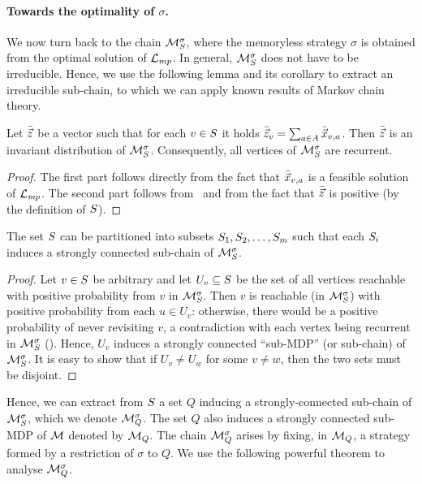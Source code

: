 \noindent
\paragraph{Towards the optimality of $ \sigma $.} We now turn back to the chain $\mathcal{M}_{S}^{\sigma}$, where the memoryless strategy $ \sigma $ is obtained from the optimal solution of $ \mathcal{L}_{\mathit{mp}} $. In general, $ \mathcal{M}_{S}^{\sigma} $ does not have to be irreducible. Hence, we use the following lemma and its corollary to extract an irreducible sub-chain, to which we can apply known results of Markov chain theory.

\begin{lemma}
\label{5-lem:mc-rec}
Let $\bar{\vec{z}}$ be a vector such that for each $v\in S$ it holds $\bar{\vec{z}}_v=\sum_{a\in A} \bar{\vec{x}}_{v,a}$. Then $\bar{\vec{z}}$ is an invariant distribution of $\mathcal{M}_{S}^{\sigma}$. Consequently, all vertices of $\mathcal{M}_{S}^{\sigma}$ are recurrent.
\end{lemma}
\begin{proof}
The first part follows directly from the fact that $\bar{\vec{x}}_{v,a}$ is a feasible solution of $\mathcal{L}_{\mathit{mp}}$. The second part follows from~ and from the fact that $\bar{\vec{z}}$ is positive (by the definition of $S$).
\end{proof}

\begin{corollary}
\label{5-cor:mp-scc-extraction}
The set $S$ can be partitioned into subsets $S_1,S_2,\dots,S_m$ such that each $S_i$ induces a strongly connected sub-chain of $\mathcal{M}_{S}^{\sigma}$.
\end{corollary}
\begin{proof}
Let $v\in S$ be arbitrary and let $U_v\subseteq S$ be the set of all vertices reachable with positive probability from $v$ in $\mathcal{M}_{S}^{\sigma}$. Then $v$ is reachable (in $\mathcal{M}_{S}^{\sigma}$) with positive probability from each $u\in U_v$: otherwise, there would be a positive probability of never revisiting $v$, a contradiction with each vertex being recurrent in $\mathcal{M}_{S}^{\sigma}$ (). Hence, $U_v$ induces a strongly connected ``sub-MDP'' (or sub-chain) of $\mathcal{M}_{S}^{\sigma}$. It is easy to show that if $U_v \neq U_w$ for some $v\neq w $, then the two sets must be disjoint.
\end{proof}

Hence, we can extract from $S$ a set $Q$ inducing a strongly-connected sub-chain of $\mathcal{M}_{S}^{\sigma}$, which we denote $\mathcal{M}^{\sigma}_{Q}$. The set $Q$ also induces a strongly connected sub-MDP of $\mathcal{M}$ denoted by $\mathcal{M}_Q$. The chain $\mathcal{M}^{\sigma}_{Q}$ arises by fixing, in $\mathcal{M}_Q$, a strategy formed by a restriction of $\sigma$ to $Q$. We use the following powerful theorem to analyse $\mathcal{M}^{\sigma}_{Q}$.

